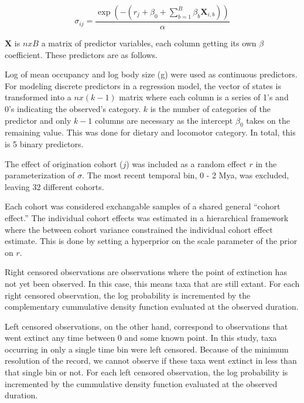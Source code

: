 \documentclass[12pt,letterpaper]{article}
\begin{document}
\begin{equation}
  \sigma_{ij} = \frac{\exp(-(r_{j} + \beta_{0} + \sum_{b = 1}^{B} \beta_{b} \mathbf{X}_{i,b}))}{\alpha}  %
  \label{eq:reg}
\end{equation}

\(\mathbf{X}\) is \(n x B\) a matrix of predictor variables, each column getting its own \(\beta\) coefficient. These predictors are as follows.

Log of mean occupancy and log body size (g) were used as continuous predictors. For modeling discrete predictors in a regression model, the vector of states is transformed into a \(n x (k - 1)\) matrix where each column is a series of 1's and 0's indicating the observed's category. \(k\) is the number of categories of the predictor and only \(k - 1\) columns are necessary as the intercept \(\beta_{0}\) takes on the remaining value. This was done for dietary and locomotor category. In total, this is 5 binary predictors.

The effect of origination cohort (\(j\)) was included as a random effect \(r\) in the parameterization of \(\sigma\). The most recent temporal bin, 0 - 2 Mya, was excluded, leaving 32 different cohorts. 

Each cohort was considered exchangable samples of a shared general ``cohort effect.'' The individual cohort effects was estimated in a hierarchical framework where the between cohort variance constrained the individual cohort effect estimate. This is done by setting a hyperprior on the scale parameter of the prior on \(r\).


Right censored observations are observations where the point of extinction has not yet been observed. In this case, this means taxa that are still extant. For each right censored observation, the log probability is incremented by the complementary cummulative density function evaluated at the observed duration.

Left censored observations, on the other hand, correspond to observations that went extinct any time between 0 and some known point. In this study, taxa occurring in only a single time bin were left censored. Because of the minimum resolution of the record, we cannot observe if these taxa went extinct in less than that single bin or not. For each left censored observation, the log probability is incremented by the cummulative density function evaluated at the observed duration.
\end{document}
